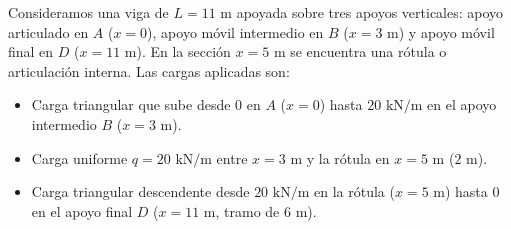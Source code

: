 
Consideramos una viga de $L = 11\text{ m}$ apoyada sobre tres apoyos verticales: apoyo articulado en $A$ ($x=0$), apoyo móvil intermedio en $B$ ($x=3\text{ m}$) y apoyo móvil final en $D$ ($x=11\text{ m}$). En la sección $x = 5\text{ m}$ se encuentra una rótula o articulación interna.
Las cargas aplicadas son:
\begin{itemize}
    \item Carga triangular que sube desde $0$ en $A$ ($x=0$) hasta $20\text{ kN/m}$ en el apoyo intermedio $B$ ($x=3\text{ m}$).
    \item Carga uniforme $q = 20\text{ kN/m}$ entre $x=3\text{ m}$ y la rótula en $x=5\text{ m}$ ($2\text{ m}$).
    \item Carga triangular descendente desde $20\text{ kN/m}$ en la rótula ($x=5\text{ m}$) hasta $0$ en el apoyo final $D$ ($x=11\text{ m}$, tramo de $6\text{ m}$).
\end{itemize}

